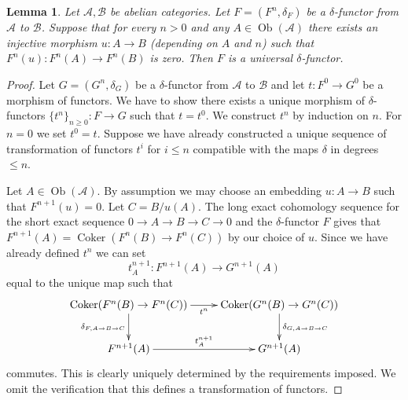 \documentclass[10pt,a4paper]{amsart}
\theoremstyle{plain}
\newtheorem{lemma}[subsection]{Lemma}
\theoremstyle{definition}
\theoremstyle{remark}
\numberwithin{equation}{subsection}
\def\Ob{\mathop{\mathrm{Ob}}\nolimits}
\def\Coker{\mathop{\mathrm{Coker}}}
\begin{document}
\begin{lemma}
\label{lemma-efface-implies-universal}
Let $\mathcal{A}, \mathcal{B}$ be abelian categories.
Let $F = (F^n, \delta_F)$ be a $\delta$-functor
from $\mathcal{A}$ to $\mathcal{B}$.
Suppose that for every $n > 0$ and any $A \in \Ob(\mathcal{A})$
there exists an injective morphism $u : A \to B$ (depending on $A$ and $n$)
such that $F^n(u) : F^n(A) \to F^n(B)$ is zero. Then $F$ is a universal
$\delta$-functor.
\end{lemma}

\begin{proof}
Let $G = (G^n, \delta_G)$ be a $\delta$-functor
from $\mathcal{A}$ to $\mathcal{B}$ and let $t : F^0 \to G^0$
be a morphism of functors. We have to show there exists
a unique morphism of $\delta$-functors $\{t^n\}_{n \geq 0} : F \to G$
such that $t = t^0$. We construct $t^n$ by induction on $n$.
For $n = 0$ we set $t^0 = t$.
Suppose we have already constructed a unique sequence of
transformation of functors $t^i$ for $i \leq n$ compatible with
the maps $\delta$ in degrees $\leq n$.

\medskip\noindent
Let $A \in \Ob(\mathcal{A})$. By assumption we may choose
an embedding $u : A \to B$ such that $F^{n + 1}(u) = 0$.
Let $C = B/u(A)$. The long exact cohomology sequence for
the short exact sequence $0 \to A \to B \to C \to 0$ and the
$\delta$-functor $F$ gives that
$F^{n + 1}(A) = \Coker(F^n(B) \to F^n(C))$ by our choice of $u$.
Since we have already defined $t^n$ we can set
$$
t^{n + 1}_A : F^{n + 1}(A) \to G^{n + 1}(A)
$$
equal to the unique map such that
$$
\xymatrix{
\Coker(F^n(B) \to F^n(C)) \ar[r]_{t^n}
\ar[d]_{\delta_{F, A \to B \to C}} &
\Coker(G^n(B) \to G^n(C))
\ar[d]^{\delta_{G, A \to B \to C}} \\
F^{n + 1}(A) \ar[r]^{t^{n + 1}_A} &
G^{n + 1}(A)
}
$$
commutes. This is clearly uniquely determined by the requirements
imposed. We omit the verification that this defines a transformation
of functors.
\end{proof}
\end{document}
